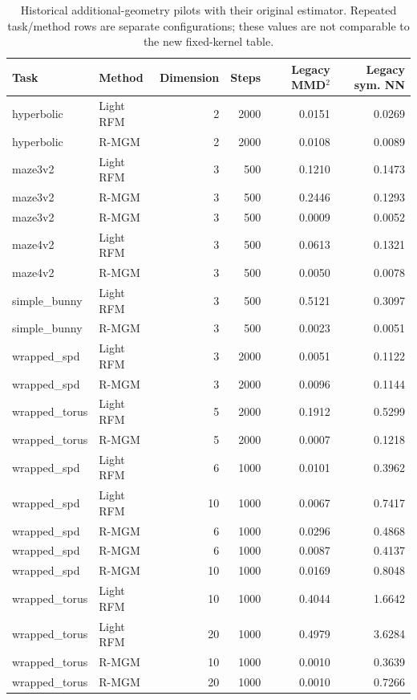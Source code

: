 \begin{table}[t]\caption{Historical additional-geometry pilots with their original estimator. Repeated task/method rows are separate configurations; these values are not comparable to the new fixed-kernel table.}\label{tab:legacy-extra}\centering\small\begin{tabular}{@{}llrrrr@{}}\toprule
Task & Method & Dimension & Steps & Legacy MMD$^2$ & Legacy sym. NN \\
\midrule
hyperbolic & Light RFM & 2 & 2000 & 0.0151 & 0.0269 \\
hyperbolic & R-MGM & 2 & 2000 & 0.0108 & 0.0089 \\
maze3v2 & Light RFM & 3 & 500 & 0.1210 & 0.1473 \\
maze3v2 & R-MGM & 3 & 500 & 0.2446 & 0.1293 \\
maze3v2 & R-MGM & 3 & 500 & 0.0009 & 0.0052 \\
maze4v2 & Light RFM & 3 & 500 & 0.0613 & 0.1321 \\
maze4v2 & R-MGM & 3 & 500 & 0.0050 & 0.0078 \\
simple\_bunny & Light RFM & 3 & 500 & 0.5121 & 0.3097 \\
simple\_bunny & R-MGM & 3 & 500 & 0.0023 & 0.0051 \\
wrapped\_spd & Light RFM & 3 & 2000 & 0.0051 & 0.1122 \\
wrapped\_spd & R-MGM & 3 & 2000 & 0.0096 & 0.1144 \\
wrapped\_torus & Light RFM & 5 & 2000 & 0.1912 & 0.5299 \\
wrapped\_torus & R-MGM & 5 & 2000 & 0.0007 & 0.1218 \\
wrapped\_spd & Light RFM & 6 & 1000 & 0.0101 & 0.3962 \\
wrapped\_spd & Light RFM & 10 & 1000 & 0.0067 & 0.7417 \\
wrapped\_spd & R-MGM & 6 & 1000 & 0.0296 & 0.4868 \\
wrapped\_spd & R-MGM & 6 & 1000 & 0.0087 & 0.4137 \\
wrapped\_spd & R-MGM & 10 & 1000 & 0.0169 & 0.8048 \\
wrapped\_torus & Light RFM & 10 & 1000 & 0.4044 & 1.6642 \\
wrapped\_torus & Light RFM & 20 & 1000 & 0.4979 & 3.6284 \\
wrapped\_torus & R-MGM & 10 & 1000 & 0.0010 & 0.3639 \\
wrapped\_torus & R-MGM & 20 & 1000 & 0.0010 & 0.7266 \\
\bottomrule\end{tabular}\end{table}
